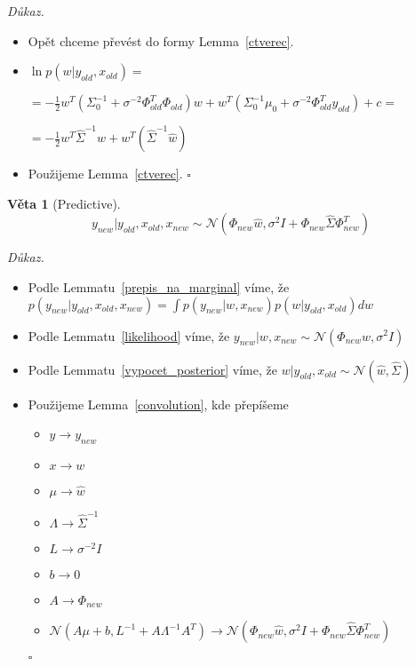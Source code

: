 \documentclass{article}
\newenvironment{pitemize}{
\begin{itemize}
  \setlength{\itemsep}{5pt}
  \setlength{\parskip}{0pt}
  \setlength{\parsep}{0pt}
}{\end{itemize}}
\newenvironment{pproof}{
\noindent\emph{Důkaz.}
\begin{pitemize}
}{\hfill$\square$\end{pitemize}}
\newcommand{\NN}{\mathcal{N}}
\newtheorem{veta}{Věta}
\theoremstyle{definition}
\begin{document}
\begin{pproof}
\item Opět chceme převést do formy Lemma~\ref{ctverec}. 

\item  $\ln p(w|y_{old},x_{old})=$

$=-\frac{1}{2}w^T\left(\Sigma_0^{-1}+\sigma^{-2}\Phi _{old}^T\Phi _{old}\right)w + w^T\left(\Sigma_0^{-1}\mu_0 +
\sigma^{-2}\Phi _{old}^Ty_{old}\right)+c=$

$=-\frac{1}{2}w^T\hat{\Sigma}^{-1}w+ w^T\left(\hat{\Sigma}^{-1}\hat{w}\right)$

\item Použijeme Lemma~\ref{ctverec}. 
\end{pproof}

\begin{veta}[Predictive]
$$y_{new}|y_{old},x_{old},x_{new}\sim\NN\left(
\Phi_{new}\hat{w}, \sigma^{2}I+\Phi_{new}\hat{\Sigma} \Phi_{new}^T\right)$$
\end{veta}
\begin{pproof}
\item Podle Lemmatu~\ref{prepis_na_marginal} víme, že 
$p(y_{new}|y_{old},x_{old},x_{new})=\int p(y_{new}|w,x_{new})p(w|y_{old},x_{old})dw$
\item Podle Lemmatu~\ref{likelihood} víme, že $y_{new}|w,x_{new}\sim\NN(\Phi_{new}w,\sigma^2I)$
\item Podle Lemmatu~\ref{vypocet_posterior} víme, že $w|y_{old},x_{old} \sim \NN(\hat{w},\hat{\Sigma})$
\item Použijeme Lemma~\ref{convolution}, kde přepíšeme
\begin{itemize}
\item $y \rightarrow y_{new}$
\item $x \rightarrow w$
\item $\mu \rightarrow \hat{w}$
\item $\Lambda \rightarrow \hat{\Sigma}^{-1}$
\item $L \rightarrow \sigma^{-2}I$
\item $b \rightarrow 0$
\item $A \rightarrow \Phi_{new}$

\item $\NN\left(A\mu+b,L^{-1}+A\Lambda^{-1} A^T\right)
\rightarrow
\NN\left( \Phi_{new}\hat{w}, \sigma^{2}I+\Phi_{new}\hat{\Sigma} \Phi_{new}^T\right)$
\end{itemize}
\end{pproof}
\end{document}
